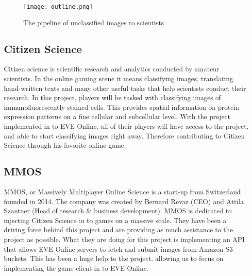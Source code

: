 \begin{figure}[H]
	\centering
	\graphicspath{ {./graphics/} }
    \centerline{\texttt{[image: outline.png]}}
    \caption{\label{fig:outline}The pipeline of unclassified images to scientists}
\end{figure}

\subsection{Citizen Science}
Citizen science is scientific research and analytics conducted by amateur scientists. In the online gaming scene it means classifying images, translating hand-written texts and many other useful tasks that help scientists conduct their research. In this project, players will be tasked with classifying images of immunofluorescently stained cells. This provides spatial information on protein expression patterns on a fine cellular and subcellular level. With the project implemented in to EVE Online, all of their players will have access to the project, and able to start classifying images right away. Therefore contributing to Citizen Science through his favorite online game.

\subsection{MMOS}
MMOS, or Massively Multiplayer Online Science is a start-up from Switzerland founded in 2014. The company was created by Bernard Revaz (CEO) and Attila Szantner (Head of research \& business development). MMOS is dedicated to injecting Citizen Science in to games on a massive scale. They have been a driving force behind this project and are providing as much assistance to the project as possible. What they are doing for this project is implementing an API that allows EVE Online servers to fetch and submit images from Amazon S3 buckets. This has been a huge help to the project, allowing us to focus on implementing the game client in to EVE Online.